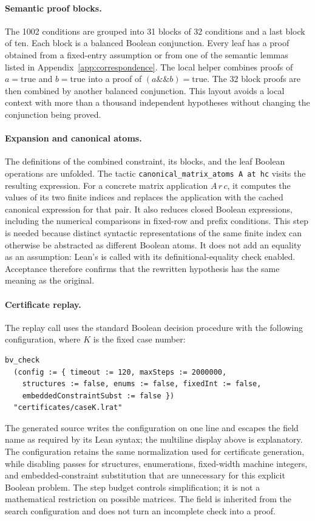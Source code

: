 \documentclass[11pt]{article}
\theoremstyle{definition}
\theoremstyle{remark}
\begin{document}
\paragraph{Semantic proof blocks.}
The 1002 conditions are grouped into 31 blocks of 32 conditions and a
last block of ten. Each block is a balanced Boolean conjunction.
Every leaf has a proof obtained from a fixed-entry assumption or from
one of the semantic lemmas listed in Appendix~\ref{app:correspondence}.
The local helper  combines proofs of
$a=\mathrm{true}$ and $b=\mathrm{true}$ into a proof of
$(a\mathbin{\&\&}b)=\mathrm{true}$. The 32 block proofs are then
combined by another balanced conjunction. This layout avoids a local
context with more than a thousand independent hypotheses without
changing the conjunction being proved.

\paragraph{Expansion and canonical atoms.}
The definitions of the combined constraint, its blocks, and the leaf
Boolean operations are unfolded. The tactic
\texttt{canonical\_matrix\_atoms A at hc} visits the resulting expression.
For a concrete matrix application $A\,r\,c$, it computes the values of
its two finite indices and replaces the application with the cached
canonical expression for that pair. It also reduces closed Boolean
 expressions, including the numerical comparisons in
fixed-row and prefix conditions. This step is needed because distinct
syntactic representations of the same finite index can otherwise be
abstracted as different Boolean atoms. It does not add an equality as
an assumption: Lean's  is called with its
definitional-equality check enabled. Acceptance therefore confirms that
the rewritten hypothesis has the same meaning as the original.

\paragraph{Certificate replay.}
The replay call uses the standard Boolean decision procedure with the
following configuration, where $K$ is the fixed case number:
\begin{verbatim}
bv_check
  (config := { timeout := 120, maxSteps := 2000000,
    structures := false, enums := false, fixedInt := false,
    embeddedConstraintSubst := false })
  "certificates/caseK.lrat"
\end{verbatim}
The generated source writes the configuration on one line and escapes
the field name  as required by its Lean syntax; the
multiline display above is explanatory. The configuration retains the
same normalization used for certificate generation, while disabling
passes for structures, enumerations, fixed-width machine integers,
and embedded-constraint substitution that are unnecessary for this
explicit Boolean problem. The step budget controls simplification;
it is not a mathematical restriction on possible matrices. The
 field is inherited from the search configuration and
does not turn an incomplete check into a proof.
\end{document}
